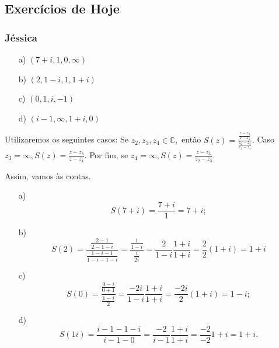 \documentclass{article}
\begin{document}
  \subsection{Exerc\'icios de Hoje }
  \subsubsection{J\'essica}
  \begin{itemize}
    \item[a)] $(7+i, 1, 0, \infty)$
    \item[b)] $(2, 1-i, 1, 1+i)$
    \item[c)] $(0, 1, i, -1)$
    \item[d)] $(i-1, \infty, 1+i, 0)$
  \end{itemize}
  Utilizaremos os seguintes casos: Se $z_{2}, z_{3}, z_{4}\in \mathbb{C},$ ent\~ao $S(z) = \displaystyle \frac{\frac{z-z_{3}}{z-z_{4}}}{\frac{z_{2} - z_{3}}{z_{2} - z_{4}}}.$
  Caso $z_{3} = \infty, \displaystyle S(z) = \frac{z - z_{3}}{z - z_{4}}.$ Por fim, se $z_{4} = \infty, S(z) = \displaystyle \frac{z - z_{3}}{z_{2} - z_{3}}.$ 

  Assim, vamos \`as contas.
  \begin{itemize}
    \item[a)] $$S(7 + i) = \frac{7 + i}{1} = 7 + i;$$
    \item[b)] $$S(2) = \frac{\frac{2 -1}{2 - 1 - i}}{\frac{1 - i - 1}{1 - i - 1 - i}} = \frac{\frac{1}{1-i}}{\frac{i}{2i}} = \frac{2}{1-i}\frac{1+i}{1+i} = \frac{2}{2}(1 + i) = 1 + i$$
    \item[c)] $$S(0) = \frac{\frac{0-i}{0+1}}{\frac{1-i}{2}} = \frac{-2i}{1-i}\frac{1+i}{1+i} = \frac{-2i}{2}(1+i) = 1-i;$$
    \item[d)] $$S(1i) = \frac{i-1-1-i}{i-1-0} = \frac{-2}{i-1}\frac{1+i}{1+i} = \frac{-2}{-2}1+i = 1+i.$$
  \end{itemize}
\end{document}
